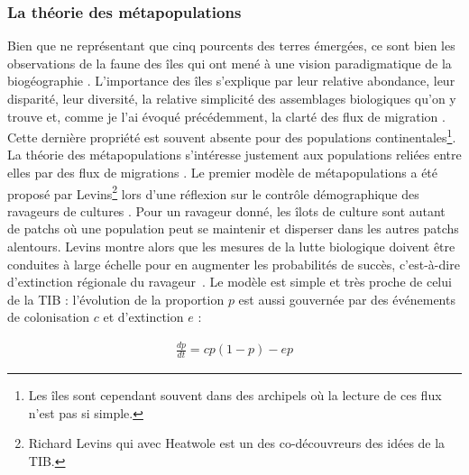 \subsubsection*{La théorie des
métapopulations}\label{la-thuxe9orie-des-muxe9tapopulations}

Bien que ne représentant que cinq pourcents des terres émergées, ce sont
bien les observations de la faune des îles qui ont mené à une vision
paradigmatique de la biogéographie \citep{Simberloff1974a}. L'importance
des îles s'explique par leur relative abondance, leur disparité, leur
diversité, la relative simplicité des assemblages biologiques qu'on y
trouve et, comme je l'ai évoqué précédemment, la clarté des flux de
migration \citep{Simberloff1974a}. Cette dernière propriété est souvent
absente pour des populations continentales\footnote{Les îles sont
  cependant souvent dans des archipels où la lecture de ces flux n'est
  pas si simple.}. La théorie des métapopulations s'intéresse justement
aux populations reliées entre elles par des flux de migrations
\citep{Hanski2010}. Le premier modèle de métapopulations a été proposé
par Levins\footnote{Richard Levins qui avec Heatwole est un des
  co-découvreurs des idées de la TIB.} lors d'une réflexion sur le
contrôle démographique des ravageurs de cultures \citep{Levins1969}.
Pour un ravageur donné, les îlots de culture sont autant de patchs où
une population peut se maintenir et disperser dans les autres patchs
alentours. Levins montre alors que les mesures de la lutte biologique
doivent être conduites à large échelle pour en augmenter les
probabilités de succès, c'est-à-dire d'extinction régionale du
ravageur~\citep{Levins1969}. Le modèle est simple et très proche de
celui de la TIB : l'évolution de la proportion \(p\) est aussi gouvernée
par des événements de colonisation \(c\) et d'extinction \(e\) :

\begin{eqnarray}
\label{eqMW}
\frac{dp}{dt} = cp(1-p)-ep
\end{eqnarray}

